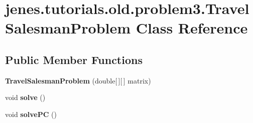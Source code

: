 \hypertarget{classjenes_1_1tutorials_1_1old_1_1problem3_1_1_travel_salesman_problem}{\section{jenes.\-tutorials.\-old.\-problem3.\-Travel\-Salesman\-Problem Class Reference}
\label{classjenes_1_1tutorials_1_1old_1_1problem3_1_1_travel_salesman_problem}
}
\subsection*{Public Member Functions}
\begin{DoxyCompactItemize}
\item 
\hypertarget{classjenes_1_1tutorials_1_1old_1_1problem3_1_1_travel_salesman_problem_ae81620be1ad206e8226f0c0dc913ab44}{{\bfseries Travel\-Salesman\-Problem} (double\mbox{[}$\,$\mbox{]}\mbox{[}$\,$\mbox{]} matrix)}\label{classjenes_1_1tutorials_1_1old_1_1problem3_1_1_travel_salesman_problem_ae81620be1ad206e8226f0c0dc913ab44}

\item 
\hypertarget{classjenes_1_1tutorials_1_1old_1_1problem3_1_1_travel_salesman_problem_ac5e087aada09768a49ab10f7178e938f}{void {\bfseries solve} ()}\label{classjenes_1_1tutorials_1_1old_1_1problem3_1_1_travel_salesman_problem_ac5e087aada09768a49ab10f7178e938f}

\item 
\hypertarget{classjenes_1_1tutorials_1_1old_1_1problem3_1_1_travel_salesman_problem_a94afc262b0ac0e840be70087dd6e11f3}{void {\bfseries solve\-P\-C} ()}\label{classjenes_1_1tutorials_1_1old_1_1problem3_1_1_travel_salesman_problem_a94afc262b0ac0e840be70087dd6e11f3}

\end{DoxyCompactItemize}
